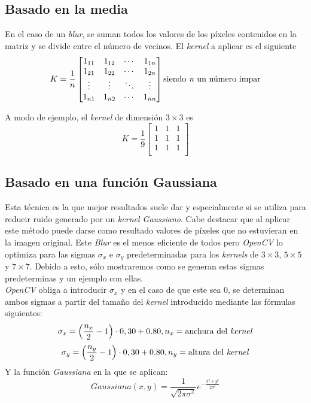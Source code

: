 \subsection{Basado en la media}
En el caso de un \emph{blur}, se suman todos los valores de los
píxeles contenidos en la matriz y se divide entre el número de
vecinos. El \emph{kernel} a aplicar es el siguiente
\begin{equation*}
  K = \frac{1}{n}
  \begin{bmatrix}
    1_{11} & 1_{12} & \cdots & 1_{1n} \\
    1_{21} & 1_{22} & \cdots & 1_{2n} \\
    \vdots & \vdots & \ddots & \vdots \\
    1_{n1} & 1_{n2} & \cdots & 1_{nn} \\
  \end{bmatrix}
  \text{siendo \emph{n} un número impar}
\end{equation*}

A modo de ejemplo, el \emph{kernel} de dimensión $3\times3$ es
\begin{equation*}
  K = \frac{1}{9}
  \begin{bmatrix}
    1 & 1 & 1 \\
    1 & 1 & 1 \\
    1 & 1 & 1 \\
  \end{bmatrix}
\end{equation*}
\subsection{Basado en una función Gaussiana}
Esta técnica es la que mejor resultados suele dar y especialmente si
se utiliza para reducir ruido generado por un \emph{kernel
  Gaussiano}. Cabe destacar que al aplicar este método puede darse
como resultado valores de píxeles que no estuvieran en la imagen
original. Este \emph{Blur} es el menos eficiente de todos pero
\emph{OpenCV} lo optimiza para las sigmas $\sigma_x$ e $\sigma_y$
predeterminadas para los \emph{kernels} de $3\times3$, $5\times5$ y
$7\times7$. Debido a esto, sólo mostraremos como se
generan estas sigmas predeterminas y un ejemplo con ellas.\\
\emph{OpenCV} obliga a introducir $\sigma_x$ y en el caso de que este sea 0,
se determinan ambos sigmas a partir del tamaño del \emph{kernel}
introducido mediante las fórmulas siguientes:
\begin{equation*}
  \sigma_x = \left(\frac{n_x}{2} - 1 \right) \cdot 0,30 + 0.80, n_x = \text{anchura del \emph{kernel}}
\end{equation*}
\begin{equation*}
  \sigma_y = \left(\frac{n_y}{2} - 1 \right) \cdot 0,30 + 0.80, n_y = \text{altura del \emph{kernel}}
\end{equation*}
Y la función \emph{Gaussiana} en la que se aplican:
\begin{equation*}
Gaussiana(x, y) = \frac{1}{\sqrt{2 \pi \sigma^{2}}}e^{- \frac{x^{2}+y^{2}}{2\sigma^{2}}}
\end{equation*}


